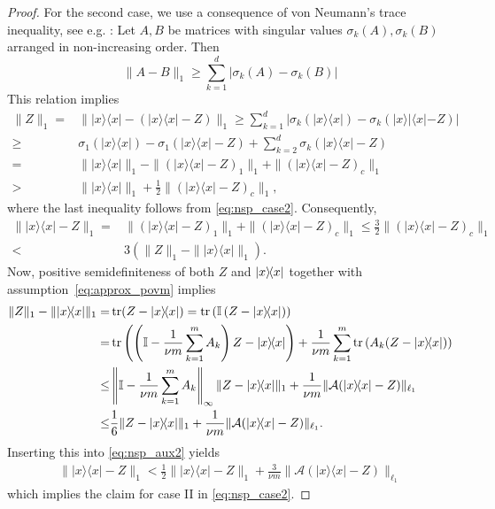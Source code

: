 \begin{proof}
For the second case, we use a consequence of von Neumann's trace inequality, see e.g. \cite[Theorem~7.4.9.1]{horn_topics_1991}: Let $A, B$ be matrices with singular values $\sigma_k (A),\sigma_k (B)$ arranged in non-increasing order.
Then
\begin{equation*}
  \| A - B \|_1 \geq \sum_{k=1}^d | \sigma_k (A) - \sigma_k (B)|
\end{equation*}
This relation implies
\begin{align*}
  \| Z \|_1 =& \| |{x} \rangle \! \langle {x}| - (|{x} \rangle \! \langle {x}|-Z) \|_1
  \geq \sum_{k=1}^d \left| \sigma_k (| x \rangle \! \langle  x|) - \sigma_k (| x \rangle \! |\langle  x|- Z ) \right| \\
  \geq & \sigma_1 (| x \rangle \langle  x|) - \sigma_1 \left( | x \rangle \! \langle  x| - Z \right)+ \sum_{k=2}^d \sigma_k \left( | x \rangle \! \langle  x| - Z\right) \\
  =&  \| | x \rangle \! \langle  x| \|_1  - \| (| x \rangle \! \langle  x| - Z)_1 \|_1 + \|(| x \rangle \! \langle  x| -Z)_c \|_1 \\
  >& \| | x \rangle \! \langle  x| \|_1 + \frac{1}{2} \| (| x \rangle \! \langle  x|-Z)_c \|_1,
\end{align*}
where the last inequality follows from \eqref{eq:nsp_case2}. Consequently,
\begin{align}
  \| | x \rangle \! \langle  x| - Z \|_1
  =& \| (| x \rangle \! \langle  x| - Z)_1 \|_1 + \| (| x \rangle \! \langle  x|-Z)_c \|_1
  \leq \frac{3}{2} \| (| x \rangle \! \langle  x|- Z )_c \|_1 \nonumber \\
  < & 3 \left( \| Z \|_1 - \| | x \rangle \! \langle  x| \|_1 \right). \label{eq:nsp_aux2}
\end{align}
Now, positive semidefiniteness of both $Z$ and $\ket{ x}\bra{ x}$ together with assumption~\eqref{eq:approx_povm} implies
\begin{align*}
  \| Z \|_1 - \| |{x} \rangle \! \langle {x}| \|_1
  =& \tr (Z-|{x} \rangle \! \langle {x}|) =  \tr \left( \mathbb{I} \left( Z-| {x} \rangle \! \langle x|\right) \right) \\
  =&  \tr \left( \left( \mathbb{I} - \frac{1}{\nu m} \sum_{k=1}^m A_k \right) Z-|{x} \rangle \! \langle {x}| \right) + \frac{1}{\nu m} \sum_{k=1}^m \tr \left( A_k (Z-|{x} \rangle \! \langle {x}|) \right) \\
  \leq &  \left\|\mathbb{I}- \frac{1}{ \nu m} \sum_{k=1}^m A_k \right\|_\infty \| Z-|{x} \rangle \! \langle {x}| \|_1 + \frac{1}{\nu m} \| \mathcal{A}(|{x} \rangle \! \langle {x}|-Z) \|_{\ell_1} \\
  \leq &  \frac{1}{6 } \| Z-|{x} \rangle \! \langle {x}| \|_1 + \frac{1}{\nu m} \| \mathcal{A}(|{x} \rangle \! \langle {x}|-Z) \|_{\ell_1}.
\end{align*}
Inserting this into \eqref{eq:nsp_aux2} yields
\begin{align*}
\| | x \rangle \! \langle  x| - Z \|_1 < \frac{1}{2} \| |{x} \rangle \! \langle {x}|-Z \|_1 +  \frac{3}{\nu m} \| \mathcal{A}(|{x} \rangle \! \langle {x}|-Z) \|_{\ell_1}
\end{align*}
which implies the claim for case II in \eqref{eq:nsp_case2}.
\end{proof}


